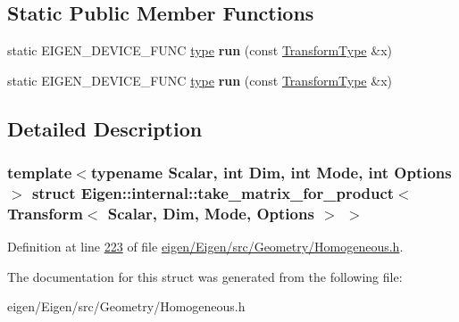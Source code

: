 \subsection*{Static Public Member Functions}
\begin{DoxyCompactItemize}
\item 
\mbox{\label{struct_eigen_1_1internal_1_1take__matrix__for__product_3_01_transform_3_01_scalar_00_01_dim_00_01_mode_00_01_options_01_4_01_4_a07971b051c2857cf6d695b056e952b49}} 
static E\+I\+G\+E\+N\+\_\+\+D\+E\+V\+I\+C\+E\+\_\+\+F\+U\+NC \hyperlink{group___core___module_class_eigen_1_1_transpose}{type} {\bfseries run} (const \hyperlink{group___geometry___module_class_eigen_1_1_transform}{Transform\+Type} \&x)
\item 
\mbox{\label{struct_eigen_1_1internal_1_1take__matrix__for__product_3_01_transform_3_01_scalar_00_01_dim_00_01_mode_00_01_options_01_4_01_4_a07971b051c2857cf6d695b056e952b49}} 
static E\+I\+G\+E\+N\+\_\+\+D\+E\+V\+I\+C\+E\+\_\+\+F\+U\+NC \hyperlink{group___core___module_class_eigen_1_1_transpose}{type} {\bfseries run} (const \hyperlink{group___geometry___module_class_eigen_1_1_transform}{Transform\+Type} \&x)
\end{DoxyCompactItemize}


\subsection{Detailed Description}
\subsubsection*{template$<$typename Scalar, int Dim, int Mode, int Options$>$\newline
struct Eigen\+::internal\+::take\+\_\+matrix\+\_\+for\+\_\+product$<$ Transform$<$ Scalar, Dim, Mode, Options $>$ $>$}



Definition at line \hyperlink{eigen_2_eigen_2src_2_geometry_2_homogeneous_8h_source_l00223}{223} of file \hyperlink{eigen_2_eigen_2src_2_geometry_2_homogeneous_8h_source}{eigen/\+Eigen/src/\+Geometry/\+Homogeneous.\+h}.



The documentation for this struct was generated from the following file\+:\begin{DoxyCompactItemize}
\item 
eigen/\+Eigen/src/\+Geometry/\+Homogeneous.\+h\end{DoxyCompactItemize}
